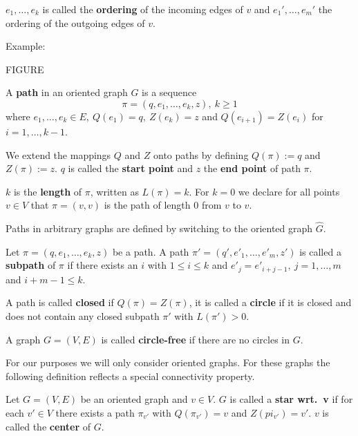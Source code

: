 $e_1, \ldots, e_k$ is called the {\bf ordering} of the incoming edges of $v$ and
$e_1', \ldots, e_m'$ the ordering of the outgoing edges of $v$.

Example:

FIGURE

\begin{definition}
A {\bf path} in an oriented graph $G$ is a sequence 
\[ \pi = (q, e_1, \ldots, e_k, z),\ k \geq 1 \]
where $ e_1, \ldots, e_k \in E,\ Q(e_1) = q,\ Z(e_k) = z$ and
$Q(e_{i+1}) = Z(e_i)$ for $i = 1, \ldots, k-1$.
\end{definition}

We extend the mappings $Q$ and $Z$ onto paths by defining $Q(\pi) := q$ and
$Z(\pi) := z$. $q$ is called the {\bf start point} and $z$ the {\bf end
point} of path $\pi$.

$k$ is the {\bf length} of $\pi$, written as $L(\pi) = k$. For $k = 0$ we
declare for all points $v \in V$ that $\pi = (v, v)$ is the path of length 0
from $v$ to $v$.

Paths in arbitrary graphs are defined by switching to the oriented graph
$\hat{G}$.

\begin{definition}
Let $\pi = (q, e_1, \ldots, e_k, z)$ be a path. A path $\pi' = (q', e'_1,
\ldots, e'_m, z')$ is called a {\bf subpath} of $\pi$ if there exists an $i$
with $1 \leq i \leq k$ and $e'_j = e'_{i+j-1},\ j = 1, \ldots, m$ and $i + m -
1 \leq k$.
\end{definition}

A path is called {\bf closed} if $Q(\pi) = Z(\pi)$, it is called a {\bf circle}
if it is closed and does not contain any closed subpath $\pi'$ with $L(\pi') >
0$.

\begin{definition}
A graph $G = (V, E)$ is called {\bf circle-free} if there are no circles in $G$.
\end{definition}

For our purposes we will only consider oriented graphs. For these graphs the
following definition reflects a special connectivity property.

\begin{definition}
Let $G = (V, E)$ be an oriented graph and $v \in V$. $G$ is called a {\bf star
wrt.\ v} if for each $v' \in V$ there exists a path $\pi_{v'}$ with
$Q(\pi_{v'}) = v$ and $Z(pi_{v'}) = v'$. $v$ is called the {\bf center} of $G$.
\end{definition} 

